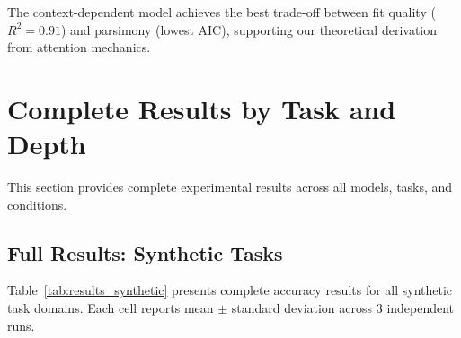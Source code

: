 \documentclass{article}
\theoremstyle{plain}
\theoremstyle{definition}
\theoremstyle{remark}
\begin{document}
The context-dependent model achieves the best trade-off between fit quality ($R^2 = 0.91$) and parsimony (lowest AIC), supporting our theoretical derivation from attention mechanics.


\section{Complete Results by Task and Depth}
\label{app:results_ext}

This section provides complete experimental results across all models, tasks, and conditions.

\subsection{Full Results: Synthetic Tasks}

Table~\ref{tab:results_synthetic} presents complete accuracy results for all synthetic task domains. Each cell reports mean $\pm$ standard deviation across 3 independent runs.
\end{document}
